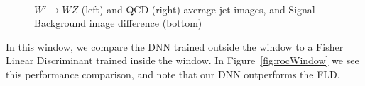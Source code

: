 \begin{figure}[bt]
  \begin{center}
  
       \\
      \caption{
        $W'\rightarrow WZ$ (left) and QCD (right) average jet-images, and Signal - Background image difference (bottom)
        \label{fig:meanImagesWindow} 
      }
    \end{center}
\end{figure}  


In this window, we compare the DNN trained outside the window to a Fisher Linear Discriminant trained inside the window. In Figure~\ref{fig:rocWindow} we see this performance comparison, and note that our DNN outperforms the FLD.

